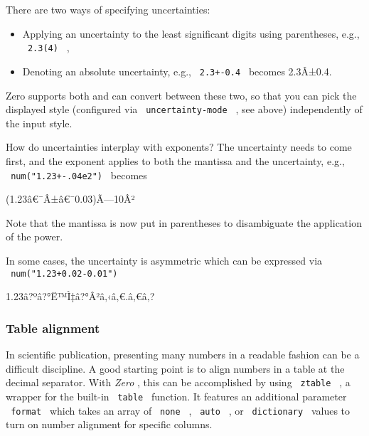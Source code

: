 There are two ways of specifying uncertainties:

\begin{itemize}
\tightlist
\item
  Applying an uncertainty to the least significant digits using
  parentheses, e.g., \texttt{\ 2.3(4)\ } ,
\item
  Denoting an absolute uncertainty, e.g., \texttt{\ 2.3+-0.4\ } becomes
  2.3Â±0.4.
\end{itemize}

Zero supports both and can convert between these two, so that you can
pick the displayed style (configured via \texttt{\ uncertainty-mode\ } ,
see above) independently of the input style.

How do uncertainties interplay with exponents? The uncertainty needs to
come first, and the exponent applies to both the mantissa and the
uncertainty, e.g., \texttt{\ num("1.23+-.04e2")\ } becomes

(1.23â€¯Â±â€¯0.03)Ã---10Â²

Note that the mantissa is now put in parentheses to disambiguate the
application of the power.

In some cases, the uncertainty is asymmetric which can be expressed via
\texttt{\ num("1.23+0.02-0.01")\ }

1.23â?ºâ?°Ë™Ì‡â?°Â²â‚‹â‚€.â‚€â‚?

\subsubsection{Table alignment}\label{table-alignment}

In scientific publication, presenting many numbers in a readable fashion
can be a difficult discipline. A good starting point is to align numbers
in a table at the decimal separator. With \emph{Zero} , this can be
accomplished by using \texttt{\ ztable\ } , a wrapper for the built-in
\texttt{\ table\ } function. It features an additional parameter
\texttt{\ format\ } which takes an array of \texttt{\ none\ } ,
\texttt{\ auto\ } , or \texttt{\ dictionary\ } values to turn on number
alignment for specific columns.

\begin{Shaded}
\begin{Highlighting}[]
\NormalTok{  [1], [3.45], [{-}11.1],}
\NormalTok{)}
\end{Highlighting}
\end{Shaded}

